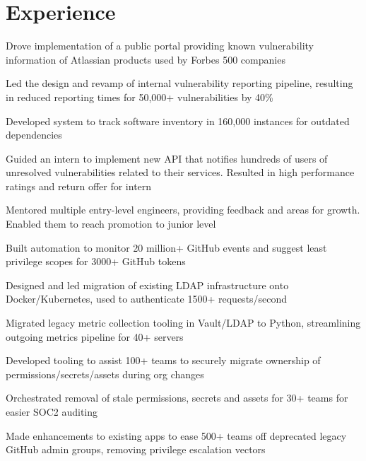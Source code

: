 \documentclass[]{deedy-resume}
\begin{document}
%
%



\section{Experience}

\begin{tightemize}
\item Drove implementation of a public portal providing known vulnerability information of Atlassian products used by Forbes 500 companies
\item Led the design and revamp of internal vulnerability reporting pipeline, resulting in reduced reporting times for 50,000+ vulnerabilities by 40\%
\item Developed system to track software inventory in 160,000 instances for outdated dependencies
\item Guided an intern to implement new API that notifies hundreds of users of unresolved vulnerabilities related to their services. Resulted in high performance ratings and return offer for intern
\item Mentored multiple entry-level engineers, providing feedback and areas for growth. Enabled them to reach promotion to junior level
\end{tightemize}
\sectionsep

\begin{tightemize}
\item Built automation to monitor 20 million+ GitHub events and suggest least privilege scopes for 3000+ GitHub tokens
\item Designed and led migration of existing LDAP infrastructure onto Docker/Kubernetes, used to authenticate 1500+ requests/second
\item Migrated legacy metric collection tooling in Vault/LDAP to Python, streamlining outgoing metrics pipeline for 40+ servers
\item Developed tooling to assist 100+ teams to securely migrate ownership of permissions/secrets/assets during org changes
\item Orchestrated removal of stale permissions, secrets and assets for 30+ teams for easier SOC2 auditing
\item Made enhancements to existing apps to ease 500+ teams off deprecated legacy GitHub admin groups, removing privilege escalation vectors
\end{tightemize}
\sectionsep
\end{document}
